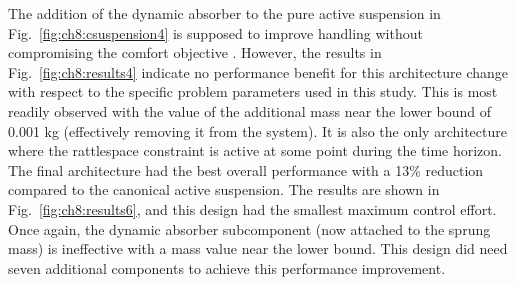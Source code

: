 The addition of the dynamic absorber to the pure active suspension in Fig.~\ref{fig:ch8:csuspension4} is supposed to improve handling without compromising the comfort objective \cite{Hrovat1993a}.
However, the results in Fig.~\ref{fig:ch8:results4} indicate no performance benefit for this architecture change with respect to the specific problem parameters used in this study.
This is most readily observed with the value of the additional mass  near the lower bound of 0.001 kg (effectively removing it from the system).
It is also the only architecture where the rattlespace constraint is active at some point during the time horizon.
The final architecture had the best overall performance with a 13\% reduction compared to the canonical active suspension.
The results are shown in Fig.~\ref{fig:ch8:results6}, and this design had the smallest maximum control effort.
Once again, the dynamic absorber subcomponent (now attached to the sprung mass) is ineffective with a mass value near the lower bound.
This design did need seven additional components to achieve this performance improvement.

